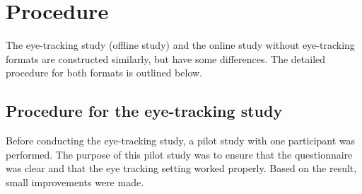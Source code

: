  
\section{Procedure}

The eye-tracking study (offline study) and the online study without eye-tracking formats are constructed similarly, but have some differences. The detailed procedure for both formats is outlined below.

\subsection{Procedure for the eye-tracking study}

Before conducting the eye-tracking study, a pilot study with one participant was performed. The purpose of this pilot study was to ensure that the questionnaire was clear and that the eye tracking setting worked properly. Based on the result, small improvements were made.



